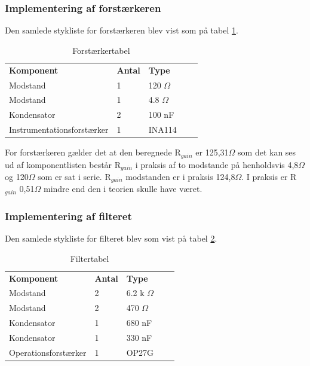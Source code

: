 \subsubsection{Implementering af forstærkeren}
Den samlede stykliste for forstærkeren blev vist som på tabel \ref{DForsttabel}.

\begin{table}[H]
\centering
\begin{tabular}{|l|l|l|ll}
\cline{1-3}
\textbf{Komponent} & \textbf{Antal} & \textbf{Type}  &  &  \\ \cline{1-3}
Modstand           & 1              & 120 $\Omega$   &  &  \\ \cline{1-3}
Modstand           & 1              & 4.8 $\Omega$   &  &  \\ \cline{1-3}
Kondensator        & 2              & 100 nF         &  &  \\ \cline{1-3}
Instrumentationsforstærker &    1   & INA114		     &  &  \\ \cline{1-3}
\end{tabular}
\caption{Forstærkertabel}
\label{DForsttabel}
\end{table}

For forstærkeren gælder det at den beregnede R$_{gain}$ er 125,31$\Omega$ som det kan ses ud af komponentlisten består R$_{gain}$ i praksis af to modstande på henholdsvis 4,8$\Omega$ og 120$\Omega$ som er sat i serie. R$_{gain}$ modstanden er i praksis 124,8$\Omega$. I praksis er R$_{gain}$ 0,51$\Omega$ mindre end den i teorien skulle have været.

\subsubsection{Implementering af filteret}
Den samlede stykliste for filteret blev som vist på tabel \ref{DFiltertabel}.

\begin{table}[H]
\centering
\begin{tabular}{|l|l|l|ll}
\cline{1-3}
\textbf{Komponent} & \textbf{Antal} & \textbf{Type}  &  &  \\ \cline{1-3}
Modstand           & 2              & 6.2 k $\Omega$ &  &  \\ \cline{1-3}
Modstand           & 2              & 470 $\Omega$   &  &  \\ \cline{1-3}
Kondensator        & 1              & 680 nF         &  &  \\ \cline{1-3}
Kondensator        & 1              & 330 nF         &  &  \\ \cline{1-3}
Operationsforstærker &    1         & OP27G          &  &  \\ \cline{1-3}
\end{tabular}
\caption{Filtertabel}
\label{DFiltertabel}
\end{table}

